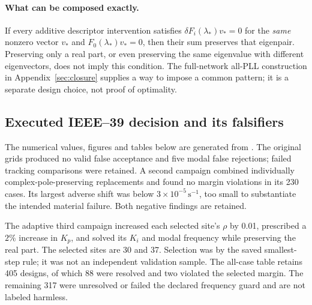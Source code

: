 \documentclass[11pt]{article}
\begin{document}
\paragraph{What can be composed exactly.}
If every additive descriptor intervention satisfies
$\delta F_i(\lambda_*)v_*=0$ for the \emph{same} nonzero vector $v_*$ and
$F_0(\lambda_*)v_*=0$, then their sum preserves that eigenpair.
Preserving only a real part, or even preserving the same eigenvalue with
different eigenvectors, does not imply this condition. The full-network
all-PLL construction in Appendix~\ref{sec:closure} supplies a way to impose
a common pattern; it is a separate design choice, not proof of optimality.

\subsection{Executed IEEE--39 decision and its falsifiers}
The numerical values, figures and tables below are generated from
.
The original grids produced no valid false acceptance and five modal false
rejections; failed tracking comparisons were retained. A second campaign
combined individually complex-pole-preserving replacements and found no
margin violations in its 230 cases. Its largest adverse shift was below
$3\times10^{-5}\,\mathrm{s}^{-1}$, too small to substantiate the intended
material failure. Both negative findings are retained.

The adaptive third campaign increased each selected site's $\rho$ by 0.01,
prescribed a $2\%$ increase in $K_p$, and solved its $K_i$ and modal frequency
while preserving the real part. The selected sites are 30 and 37. Selection
was by the saved smallest-step rule; it was not an independent validation
sample. The all-case table retains 405 designs, of which 88 were resolved
and two violated the selected margin. The remaining 317 were unresolved
or failed the declared frequency guard and are not labeled harmless.
\end{document}

